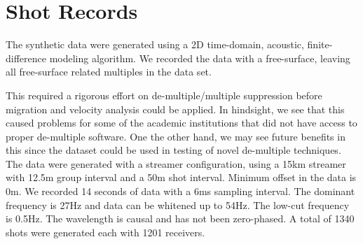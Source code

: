 

\section{Shot Records}
The synthetic data were generated using a 2D time-domain, acoustic, finite-difference
modeling algorithm. We recorded the data with a free-surface, leaving all free-surface related
multiples in the data set.

This required a rigorous effort on de-multiple/multiple suppression
before migration and velocity analysis could be applied. In hindsight, we see that this caused
problems for some of the academic institutions that did not have access to proper de-multiple
software. One the other hand, we may see future benefits in this since the dataset could be
used in testing of novel de-multiple techniques.
The data were generated with a streamer configuration, using a 15km streamer with 12.5m
group interval and a 50m shot interval. Minimum offset in the data is 0m. We recorded 14
seconds of data with a 6ms sampling interval. The dominant frequency is 27Hz and data can
be whitened up to 54Hz. The low-cut frequency is 0.5Hz. The wavelength is causal and has
not been zero-phased. A total of 1340 shots were generated each with 1201 receivers.


